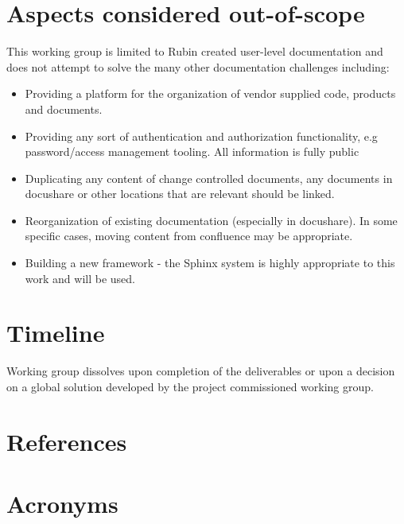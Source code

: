 \documentclass[TS,authoryear,toc]{lsstdoc}
\begin{document}
\section{Aspects considered out-of-scope} 
This working group is limited to Rubin created user-level documentation and does not attempt to solve the many other documentation challenges including:
\begin{itemize}
\item Providing a platform for the organization of vendor supplied code, products and documents.
\item Providing any sort of authentication and authorization functionality, e.g password/access management tooling. All information is fully public
\item Duplicating any content of change controlled documents,  any documents in docushare or other locations that are relevant should be linked.
\item Reorganization of existing documentation (especially in docushare). In some specific cases, moving content from confluence may be appropriate.
\item Building a new framework - the Sphinx system is highly appropriate to this work and will be used. 
\end{itemize}

\section{Timeline}
Working group dissolves upon completion of the deliverables or upon a decision on a global solution developed by the project commissioned working group. 


\appendix
\section{References} \label{sec:bib}
\renewcommand{\refname}{} %


\section{Acronyms} \label{sec:acronyms}

\end{document}
